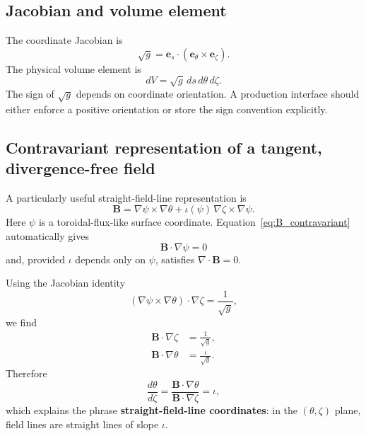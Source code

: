 \subsection{Jacobian and volume element}
The coordinate Jacobian is
\begin{equation}
\sqrt{g}=\mathbf e_s\cdot(\mathbf e_\theta\times\mathbf e_\zeta).
\label{eq:jacobian}
\end{equation}
The physical volume element is
\begin{equation}
dV=\sqrt{g}\,ds\,d\theta\,d\zeta.
\label{eq:volume_element}
\end{equation}
The sign of $\sqrt{g}$ depends on coordinate orientation. A production interface should either enforce a positive orientation or store the sign convention explicitly.

\subsection{Contravariant representation of a tangent, divergence-free field}
A particularly useful straight-field-line representation is
\begin{equation}
\boxed{
\mathbf B
=\nabla\psi\times\nabla\theta
+\iota(\psi)\,\nabla\zeta\times\nabla\psi.
}
\label{eq:B_contravariant}
\end{equation}
Here $\psi$ is a toroidal-flux-like surface coordinate. Equation~\eqref{eq:B_contravariant} automatically gives
\begin{equation}
\mathbf B\cdot\nabla\psi=0
\end{equation}
and, provided $\iota$ depends only on $\psi$, satisfies $\nabla\cdot\mathbf B=0$.

Using the Jacobian identity
\begin{equation}
(\nabla\psi\times\nabla\theta)\cdot\nabla\zeta=\frac{1}{\sqrt{g}},
\end{equation}
we find
\begin{align}
\mathbf B\cdot\nabla\zeta&=\frac{1}{\sqrt{g}},\\
\mathbf B\cdot\nabla\theta&=\frac{\iota}{\sqrt{g}}.
\end{align}
Therefore
\begin{equation}
\frac{d\theta}{d\zeta}
=\frac{\mathbf B\cdot\nabla\theta}{\mathbf B\cdot\nabla\zeta}
=\iota,
\end{equation}
which explains the phrase \textbf{straight-field-line coordinates}: in the $(\theta,\zeta)$ plane, field lines are straight lines of slope $\iota$.

